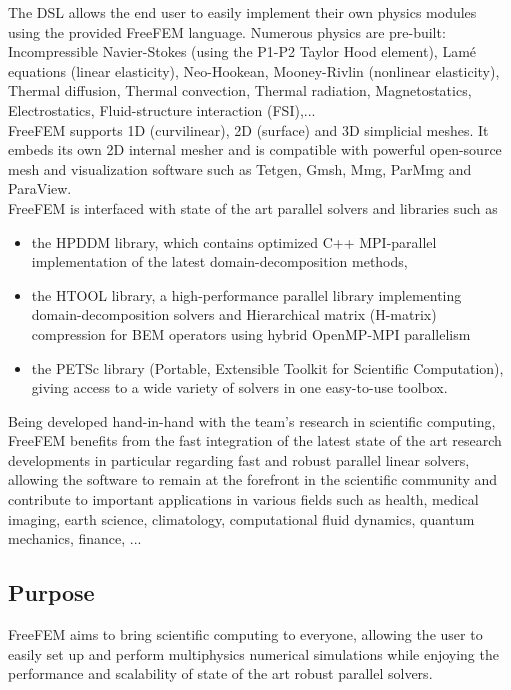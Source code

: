 The DSL allows the end user to easily implement their own physics modules using the provided FreeFEM language. Numerous physics are pre-built: Incompressible Navier-Stokes (using the P1-P2 Taylor Hood element), Lamé equations (linear elasticity), Neo-Hookean, Mooney-Rivlin (nonlinear elasticity), Thermal diffusion, Thermal convection, Thermal radiation, Magnetostatics, Electrostatics, Fluid-structure interaction (FSI),...\\
FreeFEM supports 1D (curvilinear), 2D (surface) and 3D simplicial meshes. It embeds its own 2D internal mesher and is compatible with powerful open-source mesh and visualization software such as Tetgen, Gmsh, Mmg, ParMmg and ParaView.\\

FreeFEM is interfaced with state of the art parallel solvers and libraries such as

\begin{itemize}
\item the HPDDM library, which contains optimized C++ MPI-parallel implementation of the latest domain-decomposition methods,
\item the HTOOL library, a high-performance parallel library implementing domain-decomposition solvers and Hierarchical matrix (H-matrix)
compression for BEM operators using hybrid OpenMP-MPI parallelism
\item the PETSc library (Portable, Extensible Toolkit for Scientific Computation), giving access to a wide variety of solvers in one easy-to-use toolbox.
\end{itemize}

Being developed hand-in-hand with the team's research in scientific computing, FreeFEM benefits from the fast integration of the latest state of the art research developments in particular regarding fast and robust parallel linear solvers, allowing the software to remain at the forefront in the scientific community and contribute to important applications in various fields such as health, medical imaging, earth science, climatology, computational fluid dynamics, quantum mechanics, finance, ...

\subsection{Purpose}
\label{sec:Freefem++:purpose}

FreeFEM aims to bring scientific computing to everyone, allowing the user to easily set up and perform multiphysics numerical simulations while enjoying the performance and scalability of state of the art robust parallel solvers.

